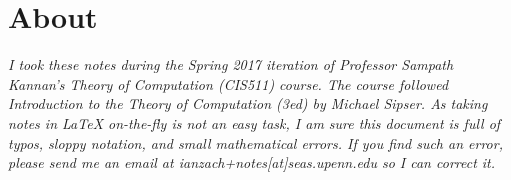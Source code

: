 




	
	
\vspace*{\fill}
\section*{About}
\textsl{{\Large I took these notes during the Spring 2017 iteration of Professor Sampath Kannan's Theory of Computation (CIS511) course.  The course followed \textit{Introduction to the Theory of Computation (3ed)} by Michael Sipser. As taking notes in \LaTeX\xspace on-the-fly is not an easy task, I am sure this document is full of typos, sloppy notation, and small mathematical errors.  If you find such an error, please send me an email at {ianzach+notes[at]seas.upenn.edu} so I can correct it.\\}}


\vspace*{1 in}
 
 \pagebreak





\pagebreak
\pagebreak
\pagebreak
\pagebreak
\pagebreak
\pagebreak
\pagebreak
\pagebreak
\pagebreak
\pagebreak
\pagebreak
\pagebreak
\pagebreak
\pagebreak
\pagebreak
\pagebreak
\pagebreak
\pagebreak
\pagebreak
\pagebreak
\pagebreak
\pagebreak
\pagebreak
\pagebreak	
\pagebreak
\pagebreak



	
